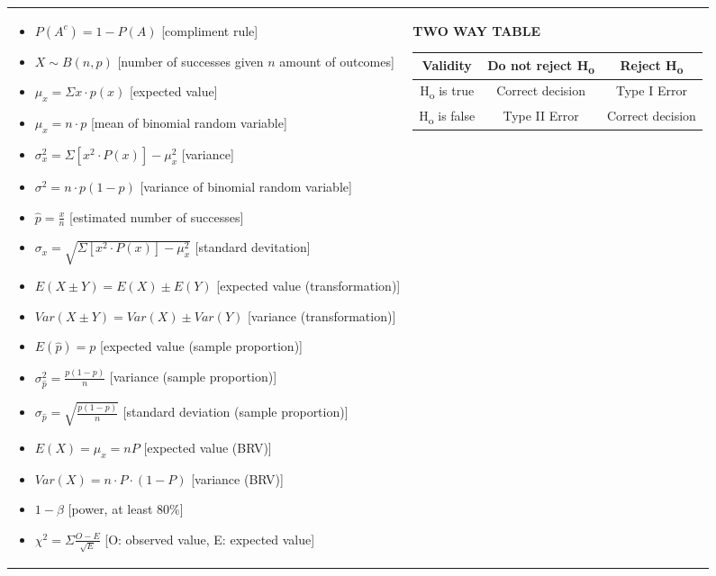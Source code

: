 \documentclass[6pt]{article}
\begin{document}
\begin{footnotesize}
\begin{tabular}{l | l}
{\begin{itemize}
\item $P(A^c) = 1 - P(A)$ [compliment rule]
\item $X \sim B(n, p)$ [number of successes given $n$ amount of outcomes]
\item $\mu_{x} = \Sigma x \cdot p(x)$ [expected value]
\item $\mu_{x} = n \cdot p$ [mean of binomial random variable]
\item $\sigma^{2}_{x} = \Sigma [x^{2} \cdot P(x)] - \mu^{2}_{x}$ [variance]
\item $\sigma^{2} = n \cdot p(1-p)$ [variance of binomial random variable]
\item $\hat{p} = \frac{x}{n}$ [estimated number of successes]
\item $\sigma_{x} = \sqrt{\Sigma [x^{2} \cdot P(x)] - \mu^{2}_{x}}$ [standard devitation]
\item $E(X \pm Y) = E(X) \pm E(Y)$ [expected value (transformation)]
\item $Var(X \pm Y) = Var(X) \pm Var(Y)$ [variance (transformation)]
\item $E(\hat{p}) = p$ [expected value (sample proportion)]
\item $\sigma_{\hat{p}}^2 = \frac{p(1-p)}{n}$ [variance (sample proportion)]
\item $\sigma_{\hat{p}} = \sqrt{\frac{p(1-p)}{n}}$ [standard deviation (sample proportion)]
\item $E(X) = \mu_{x} = nP$ [expected value (BRV)]
\item $Var(X) = n \cdot P \cdot (1-P)$ [variance (BRV)]
\item $1 - \beta$ [power, at least 80\%]
\item $\chi^2 = \Sigma \frac{O - E}{\sqrt{E}}$ [O: observed value, E: expected value]
\end{itemize}

}

&

\parbox{0.5\textwidth}{

\begin{flushright}

\begin{flushleft}
\textbf{TWO WAY TABLE}
\end{flushleft}


\begin{flushleft}
 \begin{tabular}{||c | c | c||} 
 \hline
 Validity & Do not reject H\textsubscript{o} & Reject H\textsubscript{o} \\ [0.5ex] 
 \hline\hline
 H\textsubscript{o} is true & Correct decision & Type I Error $\alpha$ \\ 
 \hline
 H\textsubscript{o} is false & Type II Error $\beta$ & Correct decision \\ 
 \hline
\end{tabular}


\end{flushleft}
\end{flushright}}
\end{tabular}
\end{footnotesize}
\end{document}
